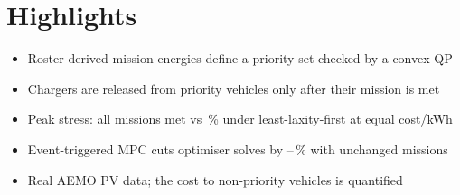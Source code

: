 \documentclass[11pt]{article}
\begin{document}
\section*{Highlights}
\begin{itemize}
  \item Roster-derived mission energies define a priority set checked by a convex QP
  \item Chargers are released from priority vehicles only after their mission is met
  \item Peak stress: all missions met vs \RMissionLLFSThreeFortyFive\,\% under least-laxity-first at equal cost/kWh
  \item Event-triggered MPC cuts optimiser solves by \RTotRedMin--\RTotRedMax\,\% with unchanged missions
  \item Real AEMO PV data; the cost to non-priority vehicles is quantified
\end{itemize}
\end{document}
